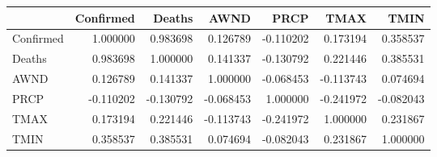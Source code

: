 \begin{tabular}{lrrrrrr}
\toprule
{} &  Confirmed &    Deaths &      AWND &      PRCP &      TMAX &      TMIN \\
\midrule
Confirmed &   1.000000 &  0.983698 &  0.126789 & -0.110202 &  0.173194 &  0.358537 \\
Deaths    &   0.983698 &  1.000000 &  0.141337 & -0.130792 &  0.221446 &  0.385531 \\
AWND      &   0.126789 &  0.141337 &  1.000000 & -0.068453 & -0.113743 &  0.074694 \\
PRCP      &  -0.110202 & -0.130792 & -0.068453 &  1.000000 & -0.241972 & -0.082043 \\
TMAX      &   0.173194 &  0.221446 & -0.113743 & -0.241972 &  1.000000 &  0.231867 \\
TMIN      &   0.358537 &  0.385531 &  0.074694 & -0.082043 &  0.231867 &  1.000000 \\
\bottomrule
\end{tabular}
